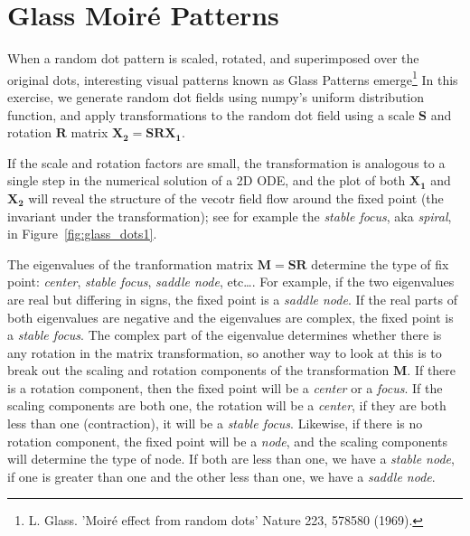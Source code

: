 \section{Glass Moir\'e Patterns}
\label{sec:glass_patterns}

When a random dot pattern is scaled, rotated, and superimposed over
the original dots, interesting visual patterns known as Glass Patterns
emerge\footnote{L. Glass. 'Moir\'e effect from random dots' Nature 223,
  578580 (1969).}  In this exercise, we generate random dot fields
using numpy's uniform distribution function, and apply
transformations to the random dot field using a scale $\mathbf{S}$
and rotation $\mathbf{R}$ matrix $\mathbf{X_2} = \mathbf{S} \mathbf{R}
\mathbf{X_1}$.

If the scale and rotation factors are small, the transformation is
analogous to a single step in the numerical solution of a 2D ODE, and
the plot of both $\mathbf{X_1}$ and $\mathbf{X_2}$ will reveal the
structure of the vecotr field flow around the fixed point (the
invariant under the transformation); see for example the
\textit{stable focus}, aka \textit{spiral}, in
Figure~\ref{fig:glass_dots1}.

The eigenvalues of the tranformation matrix $\mathbf{M} =
\mathbf{S}\mathbf{R}$ determine the type of fix point:
\textit{center}, \textit{stable focus}, \textit{saddle node},
etc\dots.  For example, if the two eigenvalues are real but differing
in signs, the fixed point is a \textit{saddle node}.  If the real
parts of both eigenvalues are negative and the eigenvalues are
complex, the fixed point is a \textit{stable focus}.  The complex part
of the eigenvalue determines whether there is any rotation in the
matrix transformation, so another way to look at this is to break out
the scaling and rotation components of the transformation
$\textbf{M}$.  If there is a rotation component, then the fixed point
will be a \textit{center} or a \textit{focus}.  If the scaling
components are both one, the rotation will be a \textit{center}, if
they are both less than one (contraction), it will be a \textit{stable
  focus}.  Likewise, if there is no rotation component, the fixed
point will be a \textit{node}, and the scaling components will
determine the type of node.  If both are less than one, we have a
\textit{stable node}, if one is greater than one and the other less
than one, we have a \textit{saddle node}.






